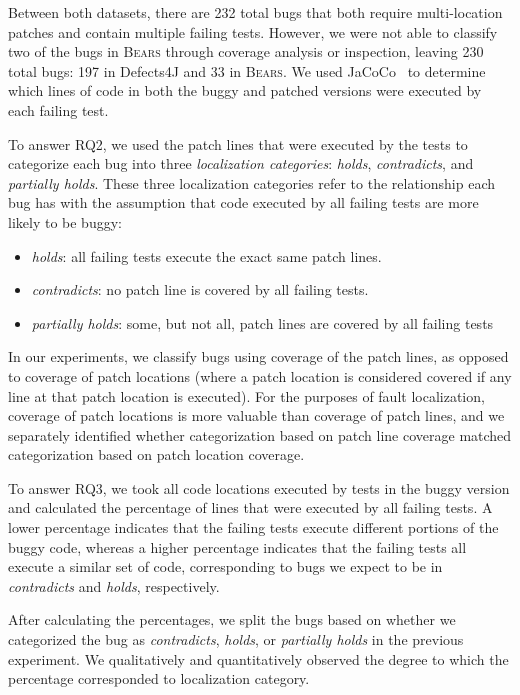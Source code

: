 \documentclass[10pt,journal,compsoc]{IEEEtran}
\newcommand\bears{\textsc{Bears}\xspace}
\begin{document}
Between both datasets, there are 232 total bugs that both require multi-location
patches and contain multiple failing tests. However, we were not able to classify
two of the bugs in \bears through coverage analysis or inspection,
leaving 230 total bugs: 197 in Defects4J and 33 in \bears. 
We used JaCoCo~\cite{jacoco}
to determine which lines of code in both the buggy and patched versions were executed
by each failing test.

To answer RQ2, we used the patch lines that were executed by the tests to categorize 
each bug into three \emph{localization categories}: \emph{holds}, \emph{contradicts}, and 
\emph{partially holds}. These three localization categories refer to the relationship each bug has 
with 
the assumption that code executed by all failing tests are more likely to be buggy: 

\begin{itemize}
\item \emph{holds}:  all failing tests execute the exact same patch lines.
\item \emph{contradicts}: no patch line is covered by all failing tests.
\item \emph{partially holds}: some, but not all, patch lines are covered by all failing tests
\end{itemize}

In our experiments, we classify bugs using coverage of the patch lines, as opposed to 
coverage of patch locations (where a patch location is considered covered if any line 
at that patch location is 
executed). For the purposes of fault localization, coverage of patch locations is more valuable 
than coverage of patch lines, and we separately identified whether categorization 
based on patch line coverage matched categorization based on patch location coverage.

To answer RQ3, we took all code locations executed by tests in the buggy version and
calculated the percentage of lines that were executed by all failing tests. 
A lower percentage indicates that the failing tests execute different portions of the buggy 
code, whereas a higher percentage indicates that the failing tests all execute a similar
set of code, corresponding to bugs we expect to be in \emph{contradicts} and \emph{holds},
respectively.

After calculating the percentages, we split the bugs based on whether we categorized the bug 
as \emph{contradicts}, \emph{holds}, or \emph{partially holds} in the previous experiment.
We qualitatively and quantitatively observed the degree to which the percentage corresponded 
to localization category.
\end{document}
